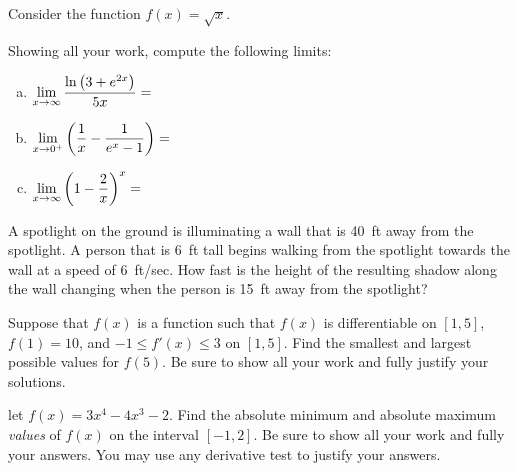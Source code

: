 \documentclass[12pt,letterpaper]{exam}
\begin{document}
\begin{questions}
\newpage
\question[10] Consider the function $f(x)= \sqrt{x}$. \par\vspace{0.1cm}



\newpage
\question[10] Showing all your work, compute the following limits: \par\vspace{0.3cm}
	\begin{enumerate}[(a)]
	\item $\displaystyle\lim_{x \to \infty} \dfrac{\ln \left(3 + e^{2x} \right)}{5x}=$ \vfill
	\item $\displaystyle\lim_{x \to 0^+} \left( \dfrac{1}{x} - \dfrac{1}{e^x - 1} \right)=$ \vfill
	\item $\displaystyle\lim_{x \to \infty} \left(1 - \dfrac{2}{x} \right)^x=$ \vfill
	\end{enumerate}



\newpage
\question[10] A spotlight on the ground is illuminating a wall that is 40~ft away from the spotlight. A person that is 6~ft tall begins walking from the spotlight towards the wall at a speed of 6~ft/sec. How fast is the height of the resulting shadow along the wall changing when the person is 15~ft away from the spotlight? 



\newpage
\question[10] Suppose that $f(x)$ is a function such that $f(x)$ is differentiable on $[1, 5]$, $f(1)= 10$, and $-1 \leq f'(x) \leq 3$ on $[1, 5]$. Find the smallest and largest possible values for $f(5)$. Be sure to show all your work and fully justify your solutions. 



\newpage
\question[10] let $f(x)= 3x^4 - 4x^3 - 2$. Find the absolute minimum and absolute maximum \textit{values} of $f(x)$ on the interval $[-1, 2]$. Be sure to show all your work and fully your answers. You may use any derivative test to justify your answers. 


\end{questions}
\end{document}
